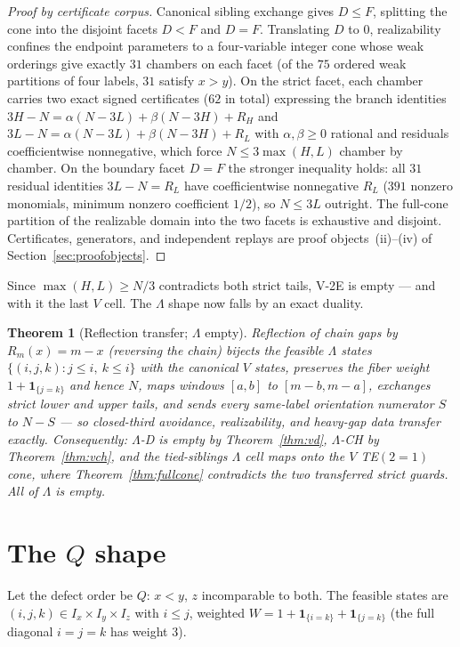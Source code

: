 \documentclass[11pt]{article}
\newtheorem{theorem}{Theorem}[section]
\theoremstyle{definition}
\theoremstyle{remark}
\begin{document}
\begin{proof}[Proof by certificate corpus]
Canonical sibling exchange gives $D\le F$, splitting the cone into the disjoint facets
$D<F$ and $D=F$. Translating $D$ to $0$, realizability confines the endpoint parameters
to a four-variable integer cone whose weak orderings give exactly $31$ chambers on each
facet (of the $75$ ordered weak partitions of four labels, $31$ satisfy $x>y$). On the
strict facet, each chamber carries two exact signed certificates ($62$ in total)
expressing the branch identities
$3H-N=\alpha(N-3L)+\beta(N-3H)+R_H$ and $3L-N=\alpha(N-3L)+\beta(N-3H)+R_L$ with
$\alpha,\beta\ge0$ rational and residuals coefficientwise nonnegative, which force
$N\le3\max(H,L)$ chamber by chamber. On the boundary facet $D=F$ the stronger inequality
holds: all $31$ residual identities $3L-N=R_L$ have coefficientwise nonnegative $R_L$
($391$ nonzero monomials, minimum nonzero coefficient $1/2$), so $N\le3L$ outright. The
full-cone partition of the realizable domain into the two facets is exhaustive and
disjoint. Certificates, generators, and independent replays are proof objects~(ii)--(iv)
of Section~\ref{sec:proofobjects}.
\end{proof}

Since $\max(H,L)\ge N/3$ contradicts both strict tails, V-2E is empty --- and with it
the last $V$ cell. The $\Lambda$ shape now falls by an exact duality.

\begin{theorem}[Reflection transfer; $\Lambda$ empty]\label{thm:reflection}
Reflection of chain gaps by $R_m(x)=m-x$ (reversing the chain) bijects the feasible
$\Lambda$ states $\{(i,j,k):j\le i,\ k\le i\}$ with the canonical $V$ states, preserves
the fiber weight $1+\mathbf1_{\{j=k\}}$ and hence $N$, maps windows $[a,b]$ to
$[m-b,m-a]$, exchanges strict lower and upper tails, and sends every same-label
orientation numerator $S$ to $N-S$ --- so closed-third avoidance, realizability, and
heavy-gap data transfer exactly. Consequently: $\Lambda$-D is empty by
Theorem~\ref{thm:vd}, $\Lambda$-CH by Theorem~\ref{thm:vch}, and the tied-siblings
$\Lambda$ cell maps onto the $V$ TE$(2{=}1)$ cone, where Theorem~\ref{thm:fullcone}
contradicts the two transferred strict guards. All of $\Lambda$ is empty.
\end{theorem}

\section{The $Q$ shape}\label{sec:q}
Let the defect order be $Q$: $x<y$, $z$ incomparable to both. The feasible states are
$(i,j,k)\in I_x\times I_y\times I_z$ with $i\le j$, weighted
$W=1+\mathbf1_{\{i=k\}}+\mathbf1_{\{j=k\}}$ (the full diagonal $i=j=k$ has weight $3$).
\end{document}
